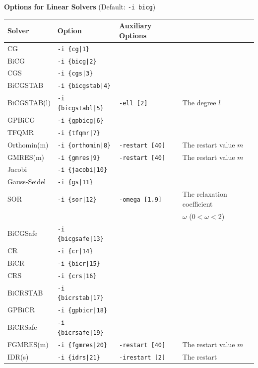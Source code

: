 \documentclass[a4paper]{article}
\begin{document}
\begin{minipage}[t]{\textwidth}
\begin{center}
{\bf Options for Linear Solvers} (Default: \verb=-i bicg=) \\
\begin{tabular}{l|lll}\hline\hline
 Solver      & Option              &  Auxiliary Options  & \\ \hline
 CG          & \verb=-i {cg|1}=         &    \\ 
 BiCG        & \verb=-i {bicg|2}=       &    \\
 CGS         & \verb=-i {cgs|3}=        &    \\
 BiCGSTAB    & \verb=-i {bicgstab|4}=   &    \\
 BiCGSTAB(l) & \verb=-i {bicgstabl|5}=  & \verb=-ell [2]=      & The degree $l$ \\
 GPBiCG      & \verb=-i {gpbicg|6}=     &    \\
 TFQMR       & \verb=-i {tfqmr|7}=      &    \\
 Orthomin(m) & \verb=-i {orthomin|8}=   & \verb=-restart [40]= & The restart
 value $m$  \\
 GMRES(m)    & \verb=-i {gmres|9}=      & \verb=-restart [40]= & The restart value $m$  \\ 
 Jacobi      & \verb=-i {jacobi|10}=    &    \\
 Gauss-Seidel& \verb=-i {gs|11}=        &    \\
 SOR         & \verb=-i {sor|12}=       & \verb=-omega [1.9]=  & The relaxation coefficient \\
             &                          &                      & $\omega$ ($0<\omega<2$) \\
 BiCGSafe    & \verb=-i {bicgsafe|13}=     &    \\
 CR          & \verb=-i {cr|14}=        &    \\ 
 BiCR        & \verb=-i {bicr|15}=      &    \\
 CRS         & \verb=-i {crs|16}=       &    \\
 BiCRSTAB    & \verb=-i {bicrstab|17}=  &    \\
 GPBiCR      & \verb=-i {gpbicr|18}=    &    \\
 BiCRSafe    & \verb=-i {bicrsafe|19}=  &    \\
 FGMRES(m)   & \verb=-i {fgmres|20}=    & \verb=-restart [40]= & The restart value $m$   \\ 
 IDR(s)      & \verb=-i {idrs|21}=      & \verb=-irestart [2]= & The restart

\end{tabular}
\end{center}
\end{minipage}
\end{document}
